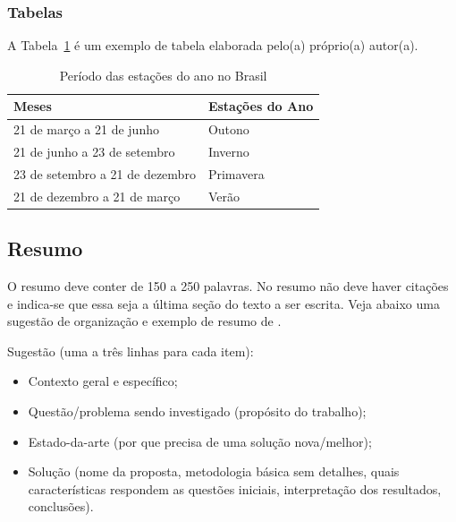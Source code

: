 \documentclass[twoside,english,brazilian]{UNISINOSartigo}
\begin{document}
\subsubsection{Tabelas}
A Tabela~\ref{tab:estacoes} é um exemplo de tabela elaborada pelo(a) próprio(a) autor(a).

\begin{table}
	\caption{Período das estações do ano no Brasil}
	\label{tab:estacoes}
	\centering%
	\begin{minipage}{.6\textwidth}
		\begin{tabular*}{\textwidth}{ll}
			\hline
			\textbf{Meses} & \textbf{Estações do Ano}\\
			\hline
			21 de março a 21 de junho & Outono\\
			21 de junho a 23 de setembro & Inverno\\
			23 de setembro a 21 de dezembro & Primavera\\
			21 de dezembro a 21 de março & Verão\\
			\hline
		\end{tabular*}
	\end{minipage}
\end{table}

\subsection{Resumo}
O resumo deve conter de 150 a 250 palavras. No resumo não deve haver citações e indica-se que essa seja a última seção do texto a ser escrita. Veja abaixo uma sugestão de organização e exemplo de resumo de .

Sugestão (uma a três linhas para cada item):
\begin{itemize}
	\item Contexto geral e específico;
	\item Questão/problema sendo investigado (propósito do trabalho);
	\item Estado-da-arte (por que precisa de uma solução nova/melhor);
	\item Solução (nome da proposta, metodologia básica sem detalhes, quais características respondem as questões iniciais, interpretação dos resultados, conclusões).
\end{itemize}
\end{document}

